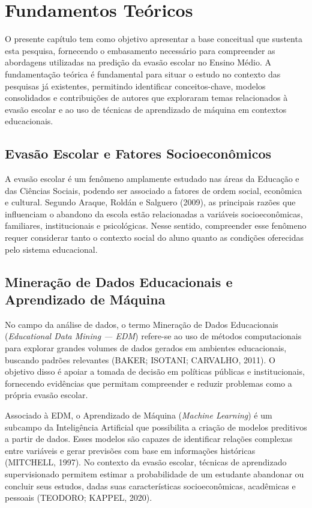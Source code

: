 \documentclass[english, spanish, brazilian]{RBIEarticle} %
\begin{document}
\section{Fundamentos Teóricos}

O presente capítulo tem como objetivo apresentar a base conceitual que sustenta esta pesquisa, fornecendo o embasamento necessário para compreender as abordagens utilizadas na predição da evasão escolar no Ensino Médio. A fundamentação teórica é fundamental para situar o estudo no contexto das pesquisas já existentes, permitindo identificar conceitos-chave, modelos consolidados e contribuições de autores que exploraram temas relacionados à evasão escolar e ao uso de técnicas de aprendizado de máquina em contextos educacionais.

\subsection{Evasão Escolar e Fatores Socioeconômicos}
A evasão escolar é um fenômeno amplamente estudado nas áreas da Educação e das Ciências Sociais, podendo ser associado a fatores de ordem social, econômica e cultural. Segundo Araque, Roldán e Salguero (2009), as principais razões que influenciam o abandono da escola estão relacionadas a variáveis socioeconômicas, familiares, institucionais e psicológicas. Nesse sentido, compreender esse fenômeno requer considerar tanto o contexto social do aluno quanto as condições oferecidas pelo sistema educacional.

\subsection{Mineração de Dados Educacionais e Aprendizado de Máquina}
No campo da análise de dados, o termo Mineração de Dados Educacionais (\textit{Educational Data Mining — EDM}) refere-se ao uso de métodos computacionais para explorar grandes volumes de dados gerados em ambientes educacionais, buscando padrões relevantes (BAKER; ISOTANI; CARVALHO, 2011). O objetivo disso é apoiar a tomada de decisão em políticas públicas e institucionais, fornecendo evidências que permitam compreender e reduzir problemas como a própria evasão escolar.

Associado à EDM, o Aprendizado de Máquina (\textit{Machine Learning}) é um subcampo da Inteligência Artificial que possibilita a criação de modelos preditivos a partir de dados. Esses modelos são capazes de identificar relações complexas entre variáveis e gerar previsões com base em informações históricas (MITCHELL, 1997). No contexto da evasão escolar, técnicas de aprendizado supervisionado permitem estimar a probabilidade de um estudante abandonar ou concluir seus estudos, dadas suas características socioeconômicas, acadêmicas e pessoais (TEODORO; KAPPEL, 2020).
\end{document}
